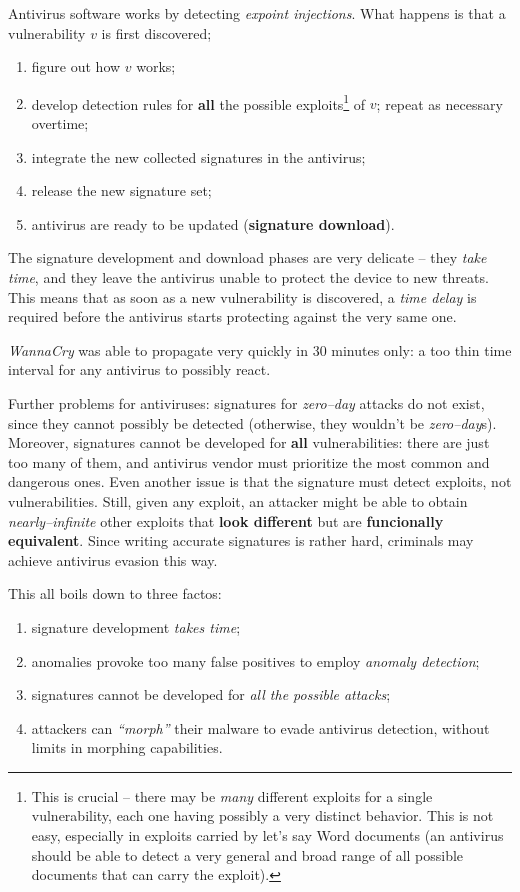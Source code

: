 \documentclass[10pt]{extbook}
\begin{document}
Antivirus software works by detecting \emph{expoint injections}. What happens is that a vulnerability $v$ is first discovered; 
\begin{enumerate}
    \item figure out how $v$ works;
    \item develop detection rules for \textbf{all} the possible
        exploits\footnote{This is crucial -- there may be \emph{many} different
        exploits for a single vulnerability, each one having possibly a very
    distinct behavior. This is not easy, especially in exploits carried by
let's say Word documents (an antivirus should be able to detect a very general
and broad range of all possible documents that can carry the exploit).} of $v$;
repeat as necessary overtime; 
    \item integrate the new collected signatures in the antivirus;
    \item release the new signature set;
    \item antivirus are ready to be updated (\textbf{signature download}).
\end{enumerate}

The signature development and download phases are very delicate -- they
\emph{take time}, and they leave the antivirus unable to protect the device to
new threats. This means that as soon as a new vulnerability is discovered, a
\emph{time delay} is required before the antivirus starts protecting against
the very same one. 

\emph{WannaCry} was able to propagate very quickly in 30 minutes only: a too
thin time interval for any antivirus to possibly react.

Further problems for antiviruses: signatures for \emph{zero--day} attacks do
not exist, since they cannot possibly be detected (otherwise, they wouldn't be
\emph{zero--day}s). Moreover, signatures cannot be developed for \textbf{all}
vulnerabilities: there are just too many of them, and antivirus vendor must
prioritize the most common and dangerous ones. Even another issue is that the
signature must detect exploits, not vulnerabilities. Still, given any
exploit, an attacker might be able to obtain \emph{nearly--infinite} other
exploits that \textbf{look different} but are \textbf{funcionally equivalent}.
Since writing accurate signatures is rather hard, criminals may achieve
antivirus evasion this way.

This all boils down to three factos:
\begin{enumerate}
    \item signature development \emph{takes time};
    \item anomalies provoke too many false positives to employ \emph{anomaly
        detection};
    \item signatures cannot be developed for \emph{all the possible attacks};
    \item attackers can \emph{``morph''} their malware to evade antivirus
        detection, without limits in morphing capabilities.
\end{enumerate}
\end{document}
